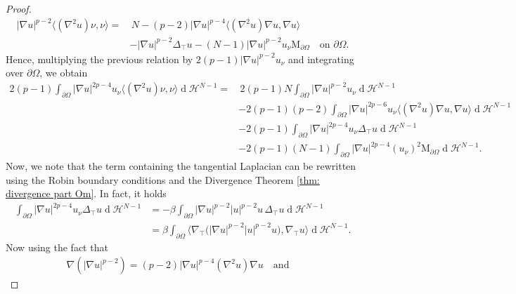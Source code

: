 \documentclass[10pt,a4paper, reqno]{amsart}
\numberwithin{equation}{section}
\renewcommand{\d}[1]{\ensuremath{\operatorname{d}\!{#1}}}
\begin{document}
\begin{proof}
\begin{equation*}
\begin{aligned}
        |\nabla u|^{p-2} \langle(\nabla^2u)\nu,\nu\rangle =& \,N - (p-2)|\nabla u|^{p-4}\langle(\nabla^2u)\nabla u,\nabla u\rangle 
        \\
        &- |\nabla u|^{p-2} \Delta_\top u - (N-1) |\nabla u|^{p-2} u_\nu \mathrm{M}_{\partial\Omega} \quad \text{on } \partial\Omega.
        \end{aligned}
    \end{equation*}
    Hence, multiplying the previous relation by $2(p-1)|\nabla u|^{p-2} u_\nu $ and integrating over $\partial\Omega$, we obtain 
    \begin{equation}\label{eq: int u nu nu}
        \begin{aligned}
        2(p-1)\int_{\partial\Omega}|\nabla u|^{2p-4} u_\nu \langle(\nabla^2u)\nu,\nu\rangle\d{}\mathcal{H}^{N-1} 
        =& \, 2(p-1)N\int_{\partial\Omega}|\nabla u|^{p-2} u_\nu\d{}\mathcal{H}^{N-1}
        \\
        &-2(p-1)(p-2)\int_{\partial\Omega}|\nabla u|^{2p-6} u_\nu \langle(\nabla^2u)\nabla u,\nabla u\rangle\d{}\mathcal{H}^{N-1}
        \\
        & -2(p-1)\int_{\partial\Omega}|\nabla u|^{2p-4} u_\nu \Delta_\top u\d{}\mathcal{H}^{N-1} 
        \\
        &-2(p-1)(N-1)\int_{\partial\Omega}|\nabla u|^{2p-4}(u_\nu)^2 \mathrm{M}_{\partial\Omega}\d{}\mathcal{H}^{N-1}.
        \end{aligned}
    \end{equation}
    Now, we note that the term containing the tangential Laplacian can be rewritten using the Robin boundary conditions and the Divergence Theorem \ref{thm: divergence part Om}. In fact, it holds
    \begin{equation*}
        \begin{split}    
        \int_{\partial\Omega}|\nabla u|^{2p-4} u_\nu \Delta_\top u\d{}\mathcal{H}^{N-1}
        &= -\beta \int_{\partial\Omega}|\nabla u|^{p-2} |u|^{p-2} u \, \Delta_\top u\d{}\mathcal{H}^{N-1}
        \\
        &= \beta \int_{\partial\Omega} \langle \nabla_\top \Big(|\nabla u|^{p-2} |u|^{p-2} u \Big), \nabla_\top u \rangle \d{}\mathcal{H}^{N-1}.
        \end{split}
    \end{equation*}
    Now using the fact that
    \begin{equation*}
    \begin{split}
        \nabla (|\nabla u|^{p-2}) = (p-2) |\nabla u|^{p-4} (\nabla^2 u) \nabla u \quad \text{and} \quad

\end{split}
\end{equation*}
\end{proof}
\end{document}
